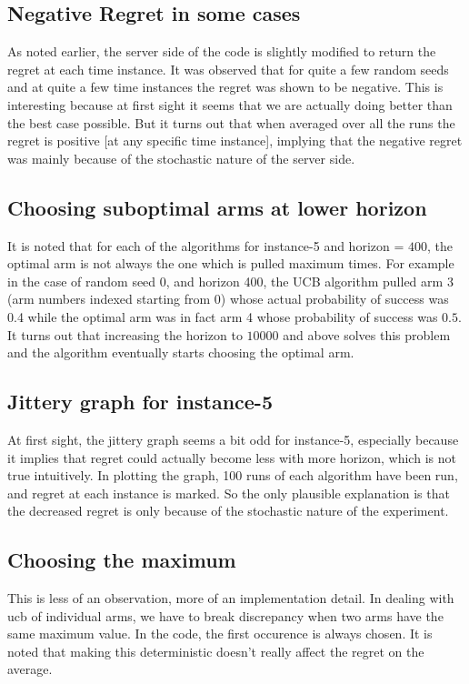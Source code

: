\documentclass{article}
\begin{document}
\subsection{Negative Regret in some cases}
As noted earlier, the server side of the code is slightly modified to return the regret at each time instance. It was observed that for quite a few random seeds and at quite a few time instances the regret was shown to be negative. This is interesting because at first sight it seems that we are actually doing better than the best case possible. But it turns out that when averaged over all the runs the regret is positive [at any specific time instance], implying that the negative regret was mainly because of the stochastic nature of the server side.

\subsection{Choosing suboptimal arms at lower horizon}
It is noted that for each of the algorithms for instance-5 and horizon = $400$, the optimal arm is not always the one which is pulled maximum times. For example in the case of random seed 0, and horizon 400, the UCB algorithm pulled arm 3 (arm numbers indexed starting from 0) whose actual probability of success was 0.4 while the optimal arm was in fact arm 4 whose probability of success was $0.5$. It turns out that increasing the horizon to $10000$ and above solves this problem and the algorithm eventually starts choosing the optimal arm.

\subsection{Jittery graph for instance-5}
At first sight, the jittery graph seems a bit odd for instance-5, especially because it implies that regret could actually become less with more horizon, which is not true intuitively. In plotting the graph, 100 runs of each algorithm have been run, and regret at each instance is marked. So the only plausible explanation is that the decreased regret is only because of the stochastic nature of the experiment.

\subsection{Choosing the maximum}
This is less of an observation, more of an implementation detail. In dealing with ucb of individual arms, we have to break discrepancy when two arms have the same maximum value. In the code, the first occurence is always chosen. It is noted that making this deterministic doesn't really affect the regret on the average.
\end{document}

